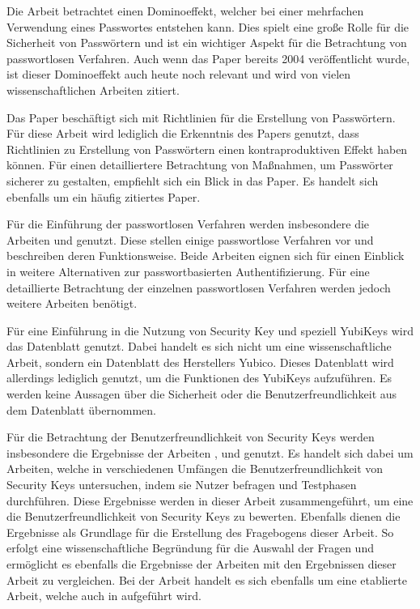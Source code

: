 Die Arbeit \cite{ives2004domino} betrachtet einen Dominoeffekt, welcher bei einer mehrfachen Verwendung eines Passwortes entstehen kann. Dies spielt eine große Rolle für die Sicherheit von Passwörtern und ist ein wichtiger Aspekt für die Betrachtung von passwortlosen Verfahren. Auch wenn das Paper bereits 2004 veröffentlicht wurde, ist dieser Dominoeffekt auch heute noch relevant und wird von vielen wissenschaftlichen Arbeiten zitiert.

Das Paper \cite{yildirim2019encouraging} beschäftigt sich mit Richtlinien für die Erstellung von Passwörtern. Für diese Arbeit wird lediglich die Erkenntnis des Papers genutzt, dass Richtlinien zu Erstellung von Passwörtern einen kontraproduktiven Effekt haben können. Für einen detailliertere Betrachtung von Maßnahmen, um Passwörter sicherer zu gestalten, empfiehlt sich ein Blick in das Paper. Es handelt sich ebenfalls um ein häufig zitiertes Paper.

Für die Einführung der passwortlosen Verfahren werden insbesondere die Arbeiten \cite{chowhan2019password} und \cite{parmar2022comprehensive} genutzt. Diese stellen einige passwortlose Verfahren vor und beschreiben deren Funktionsweise. Beide Arbeiten eignen sich für einen Einblick in weitere Alternativen zur passwortbasierten Authentifizierung. Für eine detaillierte Betrachtung der einzelnen passwortlosen Verfahren werden jedoch weitere Arbeiten benötigt.

Für eine Einführung in die Nutzung von Security Key und speziell YubiKeys wird das Datenblatt \cite{yuibkey2023fido2} genutzt. Dabei handelt es sich nicht um eine wissenschaftliche Arbeit, sondern ein Datenblatt des Herstellers Yubico. Dieses Datenblatt wird allerdings lediglich genutzt, um die Funktionen des YubiKeys aufzuführen. Es werden keine Aussagen über die Sicherheit oder die Benutzerfreundlichkeit aus dem Datenblatt übernommen.

Für die Betrachtung der Benutzerfreundlichkeit von Security Keys werden insbesondere die Ergebnisse der Arbeiten \cite{farke2020you}, \cite{lyastani2020fido2} und \cite{reynolds2018tale} genutzt. Es handelt sich dabei um Arbeiten, welche in verschiedenen Umfängen die Benutzerfreundlichkeit von Security Keys untersuchen, indem sie Nutzer befragen und Testphasen durchführen. Diese Ergebnisse werden in dieser Arbeit zusammengeführt, um eine die Benutzerfreundlichkeit von Security Keys zu bewerten. Ebenfalls dienen die Ergebnisse als Grundlage für die Erstellung des Fragebogens dieser Arbeit. So erfolgt eine wissenschaftliche Begründung für die Auswahl der Fragen und ermöglicht es ebenfalls die Ergebnisse der Arbeiten mit den Ergebnissen dieser Arbeit zu vergleichen. Bei der Arbeit \cite{reynolds2018tale} handelt es sich ebenfalls um eine etablierte Arbeit, welche auch in \cite{lyastani2020fido2} aufgeführt wird. 

